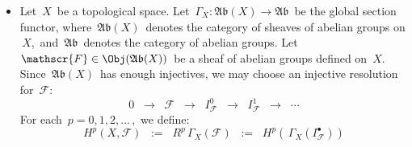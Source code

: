 \begin{itemize}
\item
	Let \,$X$\, be a topological space.
	Let \,$\Gamma_{X} : \mathfrak{Ab}(X) \longrightarrow \mathfrak{Ab}$\,
	be the global section functor,
	where  \,$\mathfrak{Ab}(X)$\, denotes the category of sheaves of abelian groups on \,$X$,\, and
	\,$\mathfrak{Ab}$\ denotes the category of abelian groups.
	\vskip 0.05cm
	Let \,$\mathscr{F} \in \Obj(\mathfrak{Ab}(X))$\, be a sheaf of abelian groups defined on \,$X$.\,
	Since \,$\mathfrak{Ab}(X)$\, has enough injectives, we may choose an injective resolution for \,$\mathscr{F}$:\,
	\begin{equation*}
	0
	\;\;\longrightarrow\;\;
		\mathscr{F} 
	\;\;\longrightarrow\;\;
		I_{\mathscr{F}}^{0}
	\;\;\longrightarrow\;\;
		I_{\mathscr{F}}^{1}
	\;\;\longrightarrow\;\;
		\cdots
	\end{equation*}
	For each \,$p = 0, 1, 2, \ldots$\,,\, we define:
	\begin{equation*}
	H^{p}(X,\mathscr{F})
	\;\; := \;\;
		R^{p}\,\Gamma_{X}(\mathscr{F})
	\;\; := \;\;
		H^{p}\!\left(\,\Gamma_{X}(I_{\mathscr{F}}^{\bullet})\right)
	\end{equation*}
	
	
\end{itemize}

